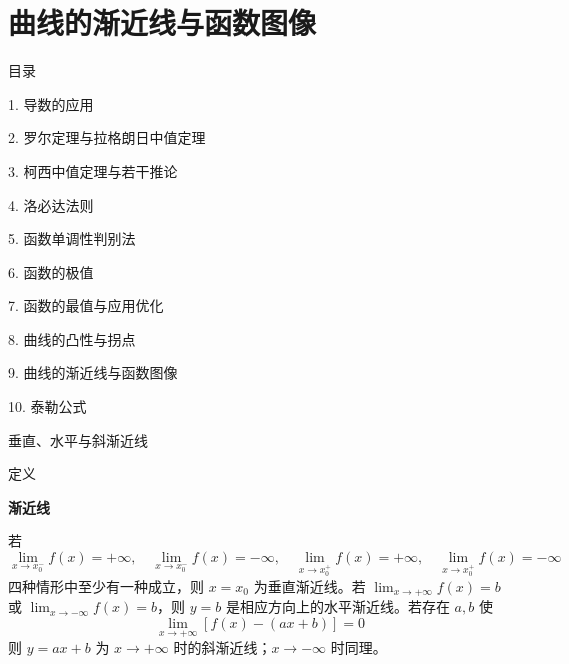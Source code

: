 \documentclass[aspectratio=169,10pt,fontset=fandol]{ctexbeamer}
\begin{document}
\section{曲线的渐近线与函数图像}
\begin{frame}[t,fragile]{目录}
\normalsize
{\color{black}\normalsize 1. 导数的应用\par}\vspace{0.22em}
{\color{black}\normalsize 2. 罗尔定理与拉格朗日中值定理\par}\vspace{0.22em}
{\color{black}\normalsize 3. 柯西中值定理与若干推论\par}\vspace{0.22em}
{\color{black}\normalsize 4. 洛必达法则\par}\vspace{0.22em}
{\color{black}\normalsize 5. 函数单调性判别法\par}\vspace{0.22em}
{\color{black}\normalsize 6. 函数的极值\par}\vspace{0.22em}
{\color{black}\normalsize 7. 函数的最值与应用优化\par}\vspace{0.22em}
{\color{black}\normalsize 8. 曲线的凸性与拐点\par}\vspace{0.22em}
{\color{blue}\normalsize 9. 曲线的渐近线与函数图像\par}\vspace{0.22em}
{\color{gray!40}\normalsize 10. 泰勒公式\par}\vspace{0.22em}
\end{frame}
\begin{frame}[t,fragile]{垂直、水平与斜渐近线}
\normalsize
\begin{block}{定义}
{\normalsize
\textbf{渐近线}\par

若
\[
\lim_{x\to x_0^-}f(x)=+\infty,\quad
\lim_{x\to x_0^-}f(x)=-\infty,\quad
\lim_{x\to x_0^+}f(x)=+\infty,\quad
\lim_{x\to x_0^+}f(x)=-\infty
\]
四种情形中至少有一种成立，则 $x=x_0$ 为垂直渐近线。若 $\lim_{x\to+\infty}f(x)=b$ 或 $\lim_{x\to-\infty}f(x)=b$，则 $y=b$ 是相应方向上的水平渐近线。若存在 $a,b$ 使
\[
\lim_{x\to+\infty}[f(x)-(ax+b)]=0
\]
则 $y=ax+b$ 为 $x\to+\infty$ 时的斜渐近线；$x\to-\infty$ 时同理。

}
\end{block}
\end{frame}
\end{document}
